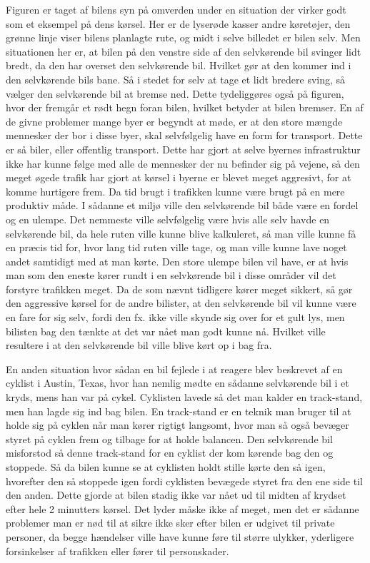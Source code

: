 Figuren er taget af bilens syn på omverden under  en situation der virker godt som  et eksempel på dens kørsel. Her er de lyserøde kasser andre køretøjer, den grønne linje viser bilens planlagte rute, og midt i selve billedet er bilen selv. Men situationen her er, at bilen på den venstre side af den selvkørende bil svinger lidt bredt, da den har overset den selvkørende bil. Hvilket gør at den kommer ind i den selvkørende bils bane. Så i stedet for selv at tage et lidt bredere sving, så vælger den selvkørende bil at bremse ned. Dette tydeliggøres også på figuren, hvor der fremgår et rødt hegn foran bilen, hvilket  betyder at bilen bremser\cite{Backchannel}. En af de givne problemer mange byer er begyndt at møde, er at den store mængde mennesker der bor i disse byer, skal selvfølgelig have en form for transport. Dette er så biler, eller offentlig transport. Dette har gjort at selve byernes infrastruktur ikke har kunne følge med alle de mennesker der nu befinder sig på vejene, så den meget øgede trafik har gjort at kørsel i byerne er blevet meget aggresivt, for at komme hurtigere frem. Da tid brugt i trafikken kunne være brugt på en mere produktiv måde\cite{Michelin}. I sådanne et miljø ville den selvkørende bil både være en fordel og en ulempe. Det nemmeste ville selvfølgelig være hvis alle selv havde en selvkørende bil, da hele ruten ville kunne blive kalkuleret, så man ville kunne få en præcis tid for, hvor lang tid ruten ville tage, og man ville kunne lave noget andet samtidigt med at man kørte. Den store ulempe bilen vil have, er at hvis man som den eneste kører rundt i en selvkørende bil i disse områder vil det forstyre trafikken meget. Da de som nævnt tidligere kører meget sikkert, så gør den aggressive kørsel for de andre bilister, at den selvkørende bil vil kunne være en fare for sig selv, fordi den fx. ikke ville skynde sig over for et gult lys, men bilisten bag den tænkte at det var nået man godt kunne nå. Hvilket ville resultere i at den selvkørende bil ville blive kørt op i bag fra.

En anden situation hvor sådan en bil fejlede i at reagere blev beskrevet af en cyklist i Austin, Texas, hvor han nemlig mødte en sådanne selvkørende bil i et kryds, mens han var på cykel. Cyklisten lavede så det man kalder en track-stand, men han lagde sig ind bag bilen. En track-stand er en teknik man bruger til at holde sig på cyklen når man kører rigtigt langsomt, hvor man så også bevæger styret på cyklen frem og tilbage for at holde balancen. Den selvkørende bil misforstod så denne track-stand for en cyklist der kom kørende bag den og stoppede. Så da bilen kunne se at cyklisten holdt stille kørte den så igen, hvorefter den så stoppede igen fordi cyklisten bevægede styret fra den ene side til den anden. Dette gjorde at bilen stadig ikke var nået ud til midten af krydset efter hele 2 minutters kørsel\cite{VOX}. Det lyder måske ikke af meget, men det er sådanne problemer man er nød til at sikre ikke sker efter bilen er udgivet til private personer, da begge hændelser ville have kunne føre til større ulykker, yderligere forsinkelser af trafikken eller fører til personskader. 